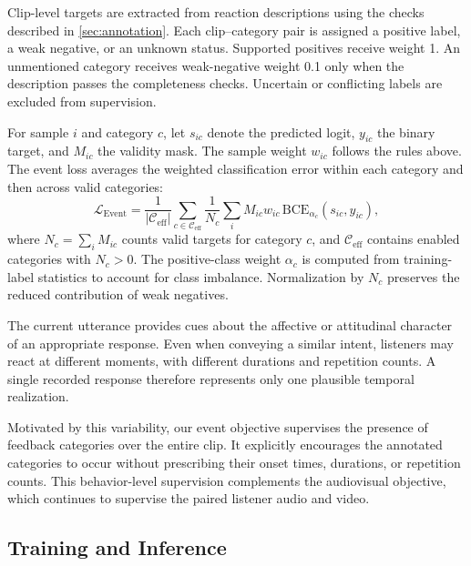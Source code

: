 Clip-level targets are extracted from reaction descriptions
using the checks described in \cref{sec:annotation}.
Each clip--category pair is assigned a positive label,
a weak negative, or an unknown status. Supported positives
receive weight 1. An unmentioned category receives
weak-negative weight 0.1 only when the description passes
the completeness checks. Uncertain or conflicting labels
are excluded from supervision.

For sample $i$ and category $c$, let $s_{ic}$ denote the
predicted logit, $y_{ic}$ the binary target, and $M_{ic}$
the validity mask. The sample weight $w_{ic}$ follows
the rules above. The event loss averages the weighted
classification error within each category and then
across valid categories:
\begin{equation}
    \mathcal L_{\mathrm{Event}}
    =
    \frac{1}{|\mathcal C_{\mathrm{eff}}|}
    \sum_{c\in\mathcal C_{\mathrm{eff}}}
    \frac{1}{N_c}
    \sum_i M_{ic}w_{ic}\,
    \mathrm{BCE}_{\alpha_c}(s_{ic},y_{ic}),
    \label{eq:event}
\end{equation}
where $N_c=\sum_i M_{ic}$ counts valid targets for category
$c$, and $\mathcal C_{\mathrm{eff}}$ contains enabled
categories with $N_c>0$. The positive-class weight
$\alpha_c$ is computed from training-label statistics
to account for class imbalance. Normalization by $N_c$
preserves the reduced contribution of weak negatives.

The current utterance provides cues about the affective or
attitudinal character of an appropriate response. 
Even when conveying a
similar intent, listeners may react at different moments,
with different durations and repetition counts. A single
recorded response therefore represents only one plausible
temporal realization.

Motivated by this variability, our event objective supervises
the presence of feedback categories over the entire clip.
It explicitly encourages the annotated categories to occur
without prescribing their onset times, durations, or repetition
counts. This behavior-level supervision complements the
audiovisual objective, which continues to supervise the paired
listener audio and video.



\subsection{Training and Inference}
\label{sec:training}

